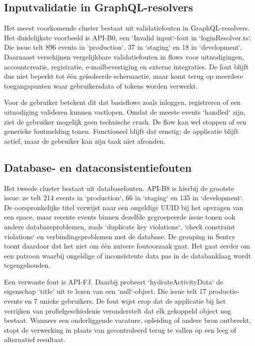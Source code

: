 \subsection{Inputvalidatie in GraphQL-resolvers}

Het meest voorkomende cluster bestaat uit validatiefouten in GraphQL-resolvers. Het duidelijkste voorbeeld is API-B0, een `Invalid input`-fout in `loginResolver.ts`. Die issue telt 896 events in `production`, 37 in `staging` en 18 in `development`. Daarnaast verschijnen vergelijkbare validatiefouten in flows voor uitnodigingen, accountcreatie, registratie, e-mailbevestiging en externe integraties. De fout blijft dus niet beperkt tot één geïsoleerde schermactie, maar komt terug op meerdere toegangspunten waar gebruikersdata of tokens worden verwerkt.

Voor de gebruiker betekent dit dat basisflows zoals inloggen, registreren of een uitnodiging valideren kunnen vastlopen. Omdat de meeste events `handled` zijn, ziet de gebruiker mogelijk geen technische crash. De flow kan wel stoppen of een generieke foutmelding tonen. Functioneel blijft dat ernstig: de applicatie blijft actief, maar de gebruiker kan zijn taak niet afronden.

\subsection{Database- en dataconsistentiefouten}

Het tweede cluster bestaat uit databasefouten. API-B8 is hierbij de grootste issue: ze telt 214 events in `production`, 66 in `staging` en 135 in `development`. De oorspronkelijke titel verwijst naar een ongeldige UUID bij het opvragen van een space, maar recente events binnen dezelfde gegroepeerde issue tonen ook andere databaseproblemen, zoals `duplicate key violations`, `check constraint violations` en verbindingsproblemen met de database. De grouping in Sentry toont daardoor dat het niet om één zuivere foutoorzaak gaat. Het gaat eerder om een patroon waarbij ongeldige of inconsistente data pas in de databanklaag wordt tegengehouden.

Een verwante fout is API-FJ. Daarbij probeert `hydrateActivityData` de eigenschap `title` uit te lezen van een `null`-object. Die issue telt 17 productie-events en 7 unieke gebruikers. De fout wijst erop dat de applicatie bij het verrijken van profielgeschiedenis veronderstelt dat elk gekoppeld object nog bestaat. Wanneer een onderliggende vacature, opleiding of andere bron ontbreekt, stopt de verwerking in plaats van gecontroleerd terug te vallen op een leeg of alternatief resultaat.

